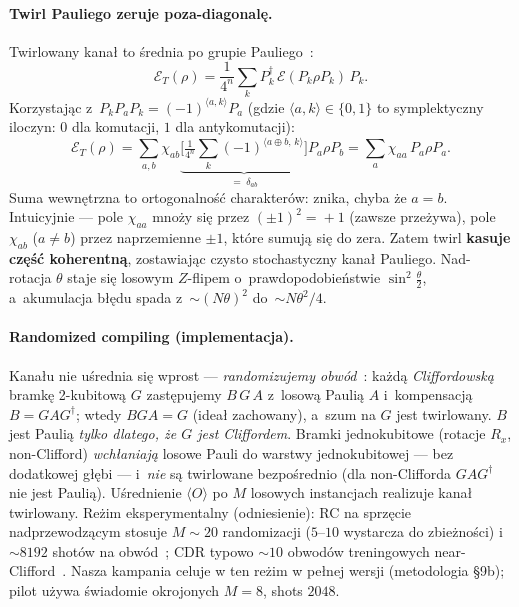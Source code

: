 \documentclass[11pt,a4paper]{article}
\begin{document}
\paragraph{Twirl Pauliego zeruje poza-diagonalę.} Twirlowany kanał to średnia po
grupie Pauliego~\cite{emerson2007,wallman2016}:
\begin{equation}
\mathcal{E}_T(\rho)=\frac{1}{4^n}\sum_k P_k^\dagger\,\mathcal{E}(P_k\rho P_k)\,P_k .
\end{equation}
Korzystając z~$P_kP_aP_k=(-1)^{\langle a,k\rangle}P_a$ (gdzie $\langle a,k\rangle\in\{0,1\}$
to symplektyczny iloczyn: $0$ dla komutacji, $1$ dla antykomutacji):
\begin{equation}
\mathcal{E}_T(\rho)=\sum_{a,b}\chi_{ab}
\underbrace{\Big[\tfrac{1}{4^n}\textstyle\sum_k(-1)^{\langle a\oplus b,\,k\rangle}\Big]}_{=\;\delta_{ab}}
P_a\rho P_b=\sum_a\chi_{aa}\,P_a\rho P_a .
\end{equation}
Suma wewnętrzna to ortogonalność charakterów: znika, chyba że $a=b$. Intuicyjnie ---
pole $\chi_{aa}$ mnoży się przez $(\pm1)^2\!=\!+1$ (zawsze przeżywa), pole
$\chi_{ab}$ ($a\neq b$) przez naprzemienne $\pm1$, które sumują się do zera. Zatem
twirl \textbf{kasuje część koherentną}, zostawiając czysto stochastyczny kanał
Pauliego. Nad-rotacja $\theta$ staje się losowym $Z$-flipem o~prawdopodobieństwie
$\sin^2\tfrac\theta2$, a~akumulacja błędu spada z~$\sim(N\theta)^2$ do~$\sim N\theta^2/4$.

\paragraph{Randomized compiling (implementacja).} Kanału nie uśrednia się wprost ---
\emph{randomizujemy obwód}~\cite{wallman2016}: każdą \emph{Cliffordowską} bramkę 2-kubitową
$G$ zastępujemy $B\,G\,A$ z~losową Paulią $A$ i~kompensacją $B=GAG^\dagger$; wtedy
$BGA=G$ (ideał zachowany), a~szum na $G$ jest twirlowany. $B$ jest Paulią
\emph{tylko dlatego, że $G$ jest Cliffordem}. Bramki jednokubitowe (rotacje $R_x$,
non-Clifford) \emph{wchłaniają} losowe Pauli do warstwy jednokubitowej --- bez
dodatkowej głębi --- i~\emph{nie} są twirlowane bezpośrednio (dla non-Clifforda
$GAG^\dagger$ nie jest Paulią). Uśrednienie $\langle O\rangle$ po $M$ losowych
instancjach realizuje kanał twirlowany. Reżim eksperymentalny (odniesienie): RC na
sprzęcie nadprzewodzącym stosuje $M\!\sim\!20$ randomizacji ($5$–$10$ wystarcza do
zbieżności) i $\sim\!8192$ shotów na obwód~\cite{hashim2021}; CDR typowo $\sim\!10$
obwodów treningowych near-Clifford~\cite{czarnik2021}. Nasza kampania celuje w ten
reżim w pełnej wersji (metodologia §9b); pilot używa świadomie okrojonych
$M\!=\!8$, shots $2048$.
\end{document}
